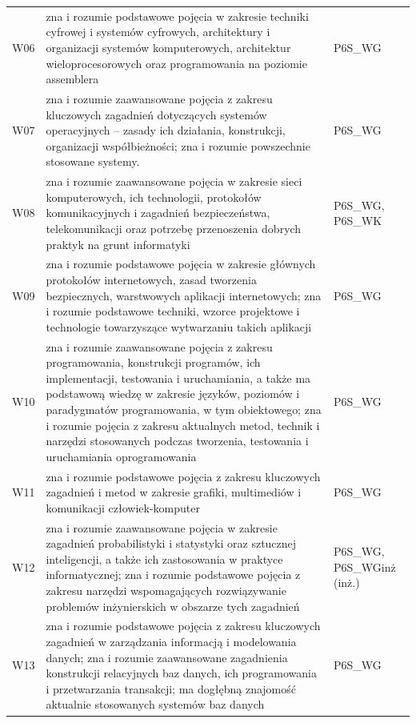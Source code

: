 \documentclass[12pt,a4paper]{article}
\begin{document}
{\begin{longtable}{m{1cm}m{9.5cm}m{3.9cm}}
\rowcolor{tableRowAlt} W06 & zna i rozumie podstawowe pojęcia w zakresie techniki cyfrowej i systemów cyfrowych, architektury i organizacji systemów komputerowych, architektur wieloprocesorowych oraz programowania na poziomie assemblera & {\scriptsize P6S\_WG} \\
\rowcolor{tableRowLight} W07 & zna i rozumie zaawansowane pojęcia z zakresu kluczowych zagadnień dotyczących systemów operacyjnych -- zasady ich działania, konstrukcji, organizacji współbieżności; zna i rozumie powszechnie stosowane systemy. & {\scriptsize P6S\_WG} \\
\rowcolor{tableRowAlt} W08 & zna i rozumie zaawansowane pojęcia w zakresie sieci komputerowych, ich technologii, protokołów komunikacyjnych i  zagadnień bezpieczeństwa, telekomunikacji oraz potrzebę przenoszenia dobrych praktyk na grunt informatyki & {\scriptsize P6S\_WG, P6S\_WK} \\
\rowcolor{tableRowLight} W09 & zna i rozumie podstawowe pojęcia w zakresie głównych protokołów internetowych, zasad tworzenia bezpiecznych, warstwowych aplikacji internetowych; zna i rozumie podstawowe techniki, wzorce projektowe i technologie towarzyszące wytwarzaniu takich aplikacji & {\scriptsize P6S\_WG} \\
\rowcolor{tableRowAlt} W10 & zna i rozumie zaawansowane pojęcia z zakresu programowania, konstrukcji programów, ich implementacji, testowania i uruchamiania, a także ma podstawową wiedzę w zakresie języków, poziomów i paradygmatów programowania, w tym obiektowego; zna i rozumie pojęcia z zakresu aktualnych metod, technik i narzędzi stosowanych podczas tworzenia, testowania i uruchamiania oprogramowania & {\scriptsize P6S\_WG} \\
\rowcolor{tableRowLight} W11 & zna i rozumie podstawowe pojęcia z zakresu kluczowych zagadnień i metod w zakresie grafiki, multimediów i komunikacji człowiek-komputer & {\scriptsize P6S\_WG} \\
\rowcolor{tableRowAlt} W12 & zna i rozumie zaawansowane pojęcia w zakresie zagadnień probabilistyki i statystyki oraz sztucznej inteligencji, a także ich zastosowania w praktyce informatycznej; zna i rozumie podstawowe pojęcia z zakresu narzędzi wspomagających rozwiązywanie problemów inżynierskich w obszarze tych zagadnień & {\scriptsize P6S\_WG, P6S\_WGinż {\scriptsize (inż.)}} \\
\rowcolor{tableRowLight} W13 & zna i rozumie podstawowe pojęcia z zakresu kluczowych zagadnień w zarządzania informacją i modelowania danych; zna i rozumie zaawansowane zagadnienia konstrukcji relacyjnych baz danych, ich programowania i przetwarzania transakcji; ma dogłębną znajomość aktualnie stosowanych systemów baz danych & {\scriptsize P6S\_WG} \\

\end{longtable}}
\end{document}
